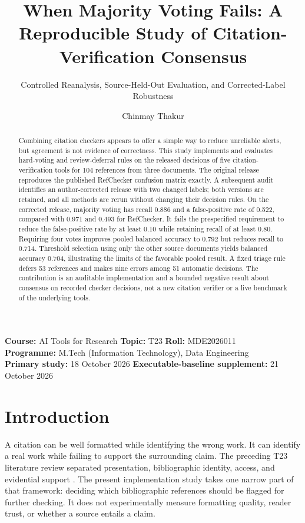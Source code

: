 \documentclass[acmsmall,screen,nonacm]{acmart}
\title[When Majority Voting Fails]{When Majority Voting Fails: A Reproducible Study of Citation-Verification Consensus}
\subtitle{Controlled Reanalysis, Source-Held-Out Evaluation, and Corrected-Label Robustness}
\author{Chinmay Thakur}
\affiliation{\institution{Indian Institute of Information Technology Allahabad}\city{Prayagraj}\country{India}}
\begin{document}
\begin{abstract}
Combining citation checkers appears to offer a simple way to reduce unreliable alerts, but agreement is not evidence of correctness. This study implements and evaluates hard-voting and review-deferral rules on the released decisions of five citation-verification tools for 104 references from three documents. The original release reproduces the published RefChecker confusion matrix exactly. A subsequent audit identifies an author-corrected release with two changed labels; both versions are retained, and all methods are rerun without changing their decision rules. On the corrected release, majority voting has recall 0.886 and a false-positive rate of 0.522, compared with 0.971 and 0.493 for RefChecker. It fails the prespecified requirement to reduce the false-positive rate by at least 0.10 while retaining recall of at least 0.80. Requiring four votes improves pooled balanced accuracy to 0.792 but reduces recall to 0.714. Threshold selection using only the other source documents yields balanced accuracy 0.704, illustrating the limits of the favorable pooled result. A fixed triage rule defers 53 references and makes nine errors among 51 automatic decisions. The contribution is an auditable implementation and a bounded negative result about consensus on recorded checker decisions, not a new citation verifier or a live benchmark of the underlying tools.
\end{abstract}
\maketitle
\noindent\textbf{Course:} AI Tools for Research \quad \textbf{Topic:} T23 \quad \textbf{Roll:} MDE2026011\\
\textbf{Programme:} M.Tech (Information Technology), Data Engineering\\
\textbf{Primary study:} 18 October 2026 \quad \textbf{Executable-baseline supplement:} 21 October 2026

\section{Introduction}
A citation can be well formatted while identifying the wrong work. It can identify a real work while failing to support the surrounding claim. The preceding T23 literature review separated presentation, bibliographic identity, access, and evidential support \citep{thakur2026}. The present implementation study takes one narrow part of that framework: deciding which bibliographic references should be flagged for further checking. It does not experimentally measure formatting quality, reader trust, or whether a source entails a claim.
\end{document}
